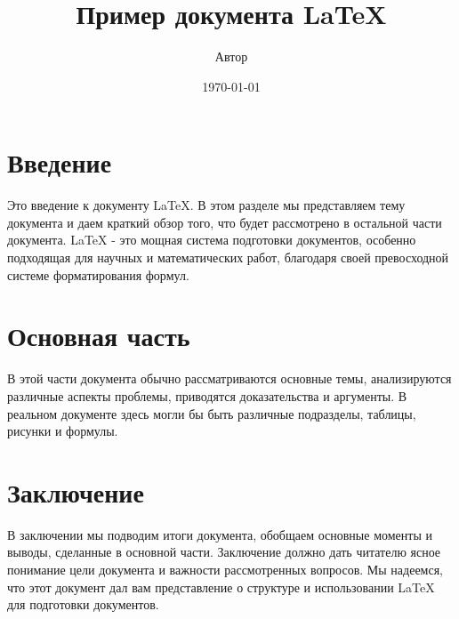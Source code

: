 \documentclass{article}
\title{Пример документа LaTeX}
\author{Автор}
\date{\today}
\begin{document}
\maketitle

\section{Введение}
Это введение к документу LaTeX. В этом разделе мы представляем тему документа и даем краткий обзор того, что будет рассмотрено в остальной части документа. LaTeX - это мощная система подготовки документов, особенно подходящая для научных и математических работ, благодаря своей превосходной системе форматирования формул.

\section{Основная часть}
В этой части документа обычно рассматриваются основные темы, анализируются различные аспекты проблемы, приводятся доказательства и аргументы. В реальном документе здесь могли бы быть различные подразделы, таблицы, рисунки и формулы.

\section{Заключение}
В заключении мы подводим итоги документа, обобщаем основные моменты и выводы, сделанные в основной части. Заключение должно дать читателю ясное понимание цели документа и важности рассмотренных вопросов. Мы надеемся, что этот документ дал вам представление о структуре и использовании LaTeX для подготовки документов.
\end{document}

